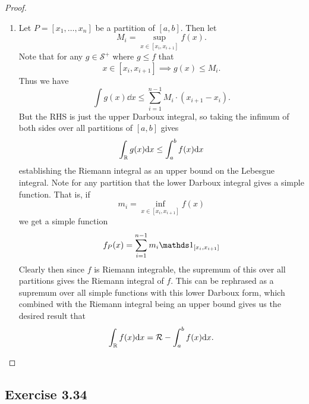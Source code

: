 \documentclass[hw_all.tex]{subfiles}
\begin{document}
\begin{proof}
\begin{enumerate}
        \item
            Let $P = [x_1, \ldots, x_n]$ be a partition of $[a,b]$. Then let
            \[
                M_i = \sup_{x \in [x_i, x_{i+1}]} f(x)
            .\]
            Note that for any $g \in \mathcal{S}^+$ where $g \leq f$ that
            \[
                x \in [x_i, x_{i+1}] \implies g(x) \leq M_i
            .\]
            Thus we have
            \[
                \int g(x) \dd x \leq \sum_{i = 1}^{n-1} M_i \cdot (x_{i + 1} - x_i)
            .\]
            But the RHS is just the upper Darboux integral, so taking the infimum of both sides over all partitions of $[a,b]$ gives
            \[
                \int_{\mathbb{R}} g(x) \dd x \leq \int_a^b f(x) \dd x
            \]
            establishing the Riemann integral as an upper bound on the Lebesgue integral. Note for any partition that the lower Darboux integral gives a simple function. That is, if
            \[
                m_i = \inf_{x \in [x_i, x_{i+1}]} f(x)
            \]
            we get a simple function
            \[
                f_P(x) = \sum_{i=1}^{n-1} m_i \ind{[x_i, x_{i+1}]}
            \]
            Clearly then since $f$ is Riemann integrable, the supremum of this over all partitions gives the Riemann integral of $f$. This can be rephrased as a supremum over all simple functions with this lower Darboux form, which combined with the Riemann integral being an upper bound gives us the desired result that
            \[
                \int_{\mathbb{R}} f(x) \dd x = \mathcal{R} - \int_{a}^{b} f(x) \dd x
            .\]
    \end{enumerate}
\end{proof}

\subsection{Exercise 3.34}
\end{document}
